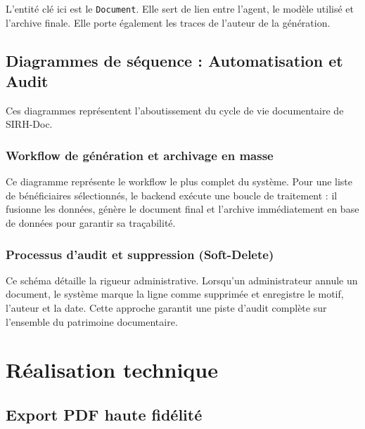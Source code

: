 L'entité clé ici est le \texttt{Document}. Elle sert de lien entre l'agent, le modèle utilisé et l'archive finale. Elle porte également les traces de l'auteur de la génération.


\subsection{Diagrammes de séquence : Automatisation et Audit}

Ces diagrammes représentent l'aboutissement du cycle de vie documentaire de SIRH-Doc.

\subsubsection{Workflow de génération et archivage en masse}

Ce diagramme représente le workflow le plus complet du système. Pour une liste de bénéficiaires sélectionnés, le backend exécute une boucle de traitement : il fusionne les données, génère le document final et l'archive immédiatement en base de données pour garantir sa traçabilité.


\subsubsection{Processus d'audit et suppression (Soft-Delete)}

Ce schéma détaille la rigueur administrative. Lorsqu'un administrateur annule un document, le système marque la ligne comme supprimée et enregistre le motif, l'auteur et la date. Cette approche garantit une piste d'audit complète sur l'ensemble du patrimoine documentaire.


\section{Réalisation technique}

\subsection{Export PDF haute fidélité}

